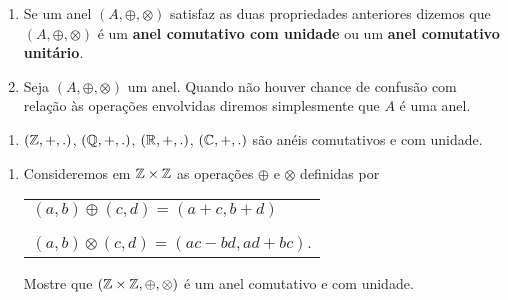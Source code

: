 \documentclass{beamer}
\begin{document}
    \begin{frame}
        \begin{observacoes}
            \begin{enumerate}[label={\arabic*})]
                \conti

                \item Se um anel $(A, \oplus, \otimes)$ \pause satisfaz as duas propriedades anteriores \pause dizemos que $(A, \oplus, \otimes)$ \'e um \textbf{anel comutativo com unidade} \pause ou um \textbf{anel comutativo unit\'ario}.\pause

                \vspace{.5cm}

                \item Seja $(A, \oplus, \otimes)$ um anel. \pause Quando n\~ao houver chance de confus\~ao com rela\c{c}\~ao \`as opera\c{c}\~oes envolvidas diremos simplesmente que \pause $A$ \'e uma anel.\pause
            \end{enumerate}
        \end{observacoes}
    \end{frame}

    \begin{frame}
        \begin{exemplos}
            \begin{enumerate}[label={\arabic*})]
                \item $(\mathbb{Z},+,.)$, \pause $(\mathbb{Q},+,.)$, \pause $(\mathbb{R},+,.)$, \pause $(\mathbb{C},+,.)$ s{\~a}o an{\'e}is comutativos \pause e com unidade.\pause

                \seti
            \end{enumerate}
        \end{exemplos}
    \end{frame}

    \begin{frame}
        \begin{exemplos}
            \begin{enumerate}[label={\arabic*})]
                \conti

                \item  Consideremos em $\mathbb{Z} \times \mathbb{Z}$ \pause as opera\c{c}\~oes $\oplus$ \pause e $\otimes$ \pause definidas por\pause
                \vspace{.3cm}
                \begin{center}
                    \begin{tabular}{l}
                        $(a, b) \oplus (c, d) = (a + c, b + d)$\\
                        \\
                        $(a ,b) \otimes (c, d) = (ac - bd, ad + bc)$.    
                    \end{tabular}
                \end{center}
                \vspace{.3cm}
                Mostre que $(\mathbb{Z} \times \mathbb{Z}, \oplus, \otimes)$ \'e um anel comutativo e com unidade.
            \end{enumerate}
        \end{exemplos}
    \end{frame}
\end{document}
